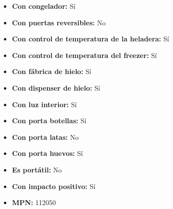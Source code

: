 \documentclass{article}
\begin{document}
\begin{adjustwidth}{2em}{}
\begin{itemize}
\begin{itemize}
    \item \textbf {Con congelador:} Sí
    \item \textbf {Con puertas reversibles:} No
    \item \textbf {Con control de temperatura de la heladera:} Sí
    \item \textbf {Con control de temperatura del freezer:} Sí
    \item \textbf {Con fábrica de hielo:} Sí
    \item \textbf {Con dispenser de hielo:} Sí
    \item \textbf {Con luz interior:} Sí
    \item \textbf {Con porta botellas:} Sí
    \item \textbf {Con porta latas:} No
    \item \textbf {Con porta huevos:} Sí
    \item \textbf {Es portátil:} No
    \item \textbf {Con impacto positivo:} Sí
    \item \textbf {MPN:} 112050
    \end{itemize}
\end{itemize}

\vspace{1\baselineskip} %
\end{adjustwidth}
\end{document}
